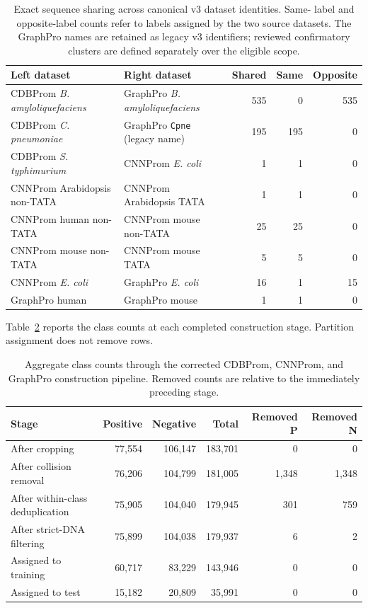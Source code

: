 \begin{table}[htbp]
  \centering
  \caption{Exact sequence sharing across canonical v3 dataset identities. Same-
  label and opposite-label counts refer to labels assigned by the two source
  datasets. The GraphPro names are retained as legacy v3 identifiers; reviewed
  confirmatory clusters are defined separately over the eligible scope.}
  \label{tab:results-cross-dataset-dependency}
  \begin{tabular}{p{}p{}rrr}
    \toprule
    Left dataset & Right dataset & Shared & Same & Opposite \\
    \midrule
    CDBProm \textit{B. amyloliquefaciens} & GraphPro \textit{B. amyloliquefaciens} & 535 & 0 & 535 \\
    CDBProm \textit{C. pneumoniae} & GraphPro \texttt{Cpne} (legacy name) & 195 & 195 & 0 \\
    CDBProm \textit{S. typhimurium} & CNNProm \textit{E. coli} & 1 & 1 & 0 \\
    CNNProm Arabidopsis non-TATA & CNNProm Arabidopsis TATA & 1 & 1 & 0 \\
    CNNProm human non-TATA & CNNProm mouse non-TATA & 25 & 25 & 0 \\
    CNNProm mouse non-TATA & CNNProm mouse TATA & 5 & 5 & 0 \\
    CNNProm \textit{E. coli} & GraphPro \textit{E. coli} & 16 & 1 & 15 \\
    GraphPro human & GraphPro mouse & 1 & 1 & 0 \\
    \bottomrule
  \end{tabular}
\end{table}

Table~\ref{tab:results-filtering-stage-counts} reports the class counts at each
completed construction stage. Partition assignment does not remove rows.

\begin{table}[htbp]
  \centering
  \caption{Aggregate class counts through the corrected CDBProm, CNNProm, and GraphPro construction pipeline. Removed counts are relative to the immediately preceding stage.}
  \label{tab:results-filtering-stage-counts}
  \begin{tabular}{lrrrrr}
    \toprule
    Stage & Positive & Negative & Total & Removed P & Removed N \\
    \midrule
    After cropping & 77,554 & 106,147 & 183,701 & 0 & 0 \\
    After collision removal & 76,206 & 104,799 & 181,005 & 1,348 & 1,348 \\
    After within-class deduplication & 75,905 & 104,040 & 179,945 & 301 & 759 \\
    After strict-DNA filtering & 75,899 & 104,038 & 179,937 & 6 & 2 \\
    Assigned to training & 60,717 & 83,229 & 143,946 & 0 & 0 \\
    Assigned to test & 15,182 & 20,809 & 35,991 & 0 & 0 \\
    \bottomrule
  \end{tabular}
\end{table}

